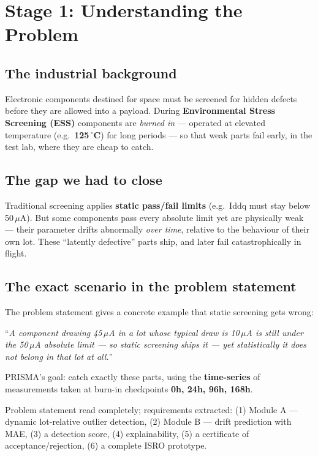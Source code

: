 \documentclass[11pt,a4paper]{article}
\newcommand{\keys}[1]{\textbf{\sffamily#1}}
\newcommand{\milestone}[1]{\par\vspace{0.6em}\noindent
  \begin{tcolorbox}[colback=solgreen!8,colframe=solgreen,
    title={\sffamily\bfseries\color{white}Milestone},arc=2pt,boxrule=1pt]
    #1
  \end{tcolorbox}\par\vspace{0.4em}}
\begin{document}
\section{Stage 1: Understanding the Problem}

\subsection*{The industrial background}
Electronic components destined for space must be screened for hidden defects before they are
allowed into a payload. During \textbf{Environmental Stress Screening (ESS)} components are
\emph{burned in} --- operated at elevated temperature (e.g.\ \textbf{125\,$^{\circ}$C}) for long
periods --- so that weak parts fail early, in the test lab, where they are cheap to catch.

\subsection*{The gap we had to close}
Traditional screening applies \textbf{static pass/fail limits} (e.g.\ Iddq must stay below
50\,$\mu$A). But some components pass every absolute limit yet are physically weak --- their
parameter drifts abnormally \emph{over time}, relative to the behaviour of their own lot. These
``latently defective'' parts ship, and later fail catastrophically in flight.

\subsection*{The exact scenario in the problem statement}
The problem statement gives a concrete example that static screening gets wrong:

\medskip
\noindent ``\emph{A component drawing 45\,$\mu$A in a lot whose typical draw is 10\,$\mu$A is
still under the 50\,$\mu$A absolute limit --- so static screening ships it --- yet statistically
it does not belong in that lot at all.}''

\medskip
\noindent PRISMA's goal: catch exactly these parts, using the \textbf{time-series} of measurements
taken at burn-in checkpoints \keys{0h, 24h, 96h, 168h}.

\milestone{Problem statement read completely; requirements extracted: (1) Module A --- dynamic
  lot-relative outlier detection, (2) Module B --- drift prediction with MAE, (3) a detection
  score, (4) explainability, (5) a certificate of acceptance/rejection, (6) a complete ISRO
  prototype.}
\end{document}
